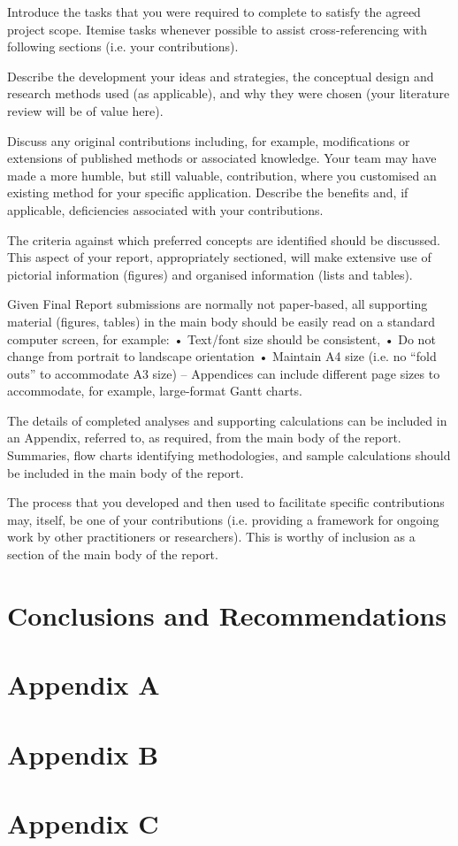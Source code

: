 \documentclass[]{article}
\begin{document}
Introduce the tasks that you were required to complete to satisfy the agreed project scope.  Itemise tasks whenever possible to assist cross-referencing with following sections (i.e. your contributions).

Describe the development your ideas and strategies, the conceptual design and research methods used (as applicable), and why they were chosen (your literature review will be of value here).  

Discuss any original contributions including, for example, modifications or extensions of published methods or associated knowledge.  Your team may have made a more humble, but still valuable, contribution, where you customised an existing method for your specific application.  Describe the benefits and, if applicable, deficiencies associated with your contributions.

The criteria against which preferred concepts are identified should be discussed.  This aspect of your report, appropriately sectioned, will make extensive use of pictorial information (figures) and organised information (lists and tables).  

Given Final Report submissions are normally not paper-based, all supporting material (figures, tables) in the main body should be easily read on a standard computer screen, for example:
•	Text/font size should be consistent, 
•	Do not change from portrait to landscape orientation 
•	Maintain A4 size (i.e. no “fold outs” to accommodate A3 size) – Appendices can include different page sizes to accommodate, for example, large-format Gantt charts.

The details of completed analyses and supporting calculations can be included in an Appendix, referred to, as required, from the main body of the report.  Summaries, flow charts identifying methodologies, and sample calculations should be included in the main body of the report.

The process that you developed and then used to facilitate specific contributions may, itself, be one of your contributions (i.e. providing a framework for ongoing work by other practitioners or researchers).  This is worthy of inclusion as a section of the main body of the report.
\color{black}

\section{Conclusions and Recommendations}


\newpage


\appendix
\newpage
\section*{Appendix A}


\newpage
\section*{Appendix B}


\section*{Appendix C}

\end{document}
